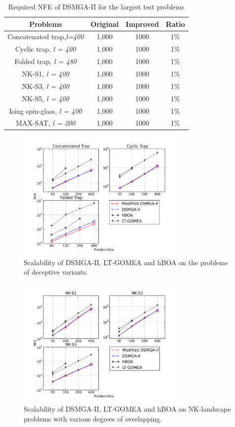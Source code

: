 \documentclass{sig-alternate-05-2015}
\begin{document}
\begin{table}[ht]
\centering
\begin{tabular}{ |c|c|c|c| } \hline
Problems& Original &Improved &Ratio\\ \hline
Concatenated trap,\textit{l=400} 	& 1,000& 1000&1\%\\ \hline
Cyclic trap,\textit{ l = 400} 		& 1,000& 1000&1\%\\ \hline
Folded trap,\textit{ l = 480}	 	& 1,000& 1000&1\%\\ \hline
NK-S1,\textit{ l = 400} 				& 1,000& 1000&1\%\\ \hline
NK-S3,\textit{ l = 400} 				& 1,000& 1000&1\%\\ \hline
NK-S5,\textit{ l = 400} 				& 1,000& 1000&1\%\\ \hline
Ising spin-glass,\textit{ l = 400} 	& 1,000& 1000&1\%\\ \hline
MAX-SAT,\textit{ l = 200} 			& 1,000& 1000&1\%\\ \hline
\end{tabular}
\caption{Required NFE of DSMGA-II for the largest test problems}
\end{table}



\begin{figure}
\centering
\includegraphics[width=3.3in]{trapResults}
\caption{Scalability of DSMGA-II, LT-GOMEA and hBOA on the problems of deceptive variants.}
\end{figure}

\begin{figure}
\centering
\includegraphics[width=3.3in]{nkResults}
\caption{Scalability of DSMGA-II, LT-GOMEA and hBOA on NK-landscape problems with various degrees of overlapping.}
\end{figure}
\end{document}
